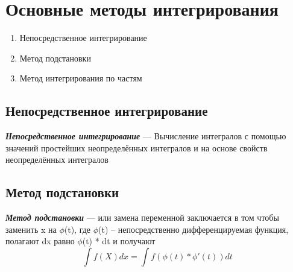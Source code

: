\documentclass[a5paper]{article}
\begin{document}
	\section{Основные методы интегрирования}
	\begin{enumerate}
		\item Непосредственное интегрирование 
		\item Метод подстановки
		\item Метод интегрирования по частям 
	\end{enumerate}
	
	\subsection{Непосредственное интегрирование}
	\textbf{\textit{Непосредственное интегрирование}} --- Вычисление интегралов с помощью значений простейших неопределённых интегралов и на основе свойств неопределённых интегралов
	\subsection{Метод подстановки}
	\textbf{\textit{Метод подстановки}} --- или замена переменной заключается в том чтобы заменить x на $\phi$(t), где $\phi$(t) -- непосредственно дифференцируемая функция, полагают dx равно  $\phi$(t) * dt  и получают \[ \int f(X)dx = \int f(\phi(t)*\phi'(t))dt \]   
	
\end{document}
